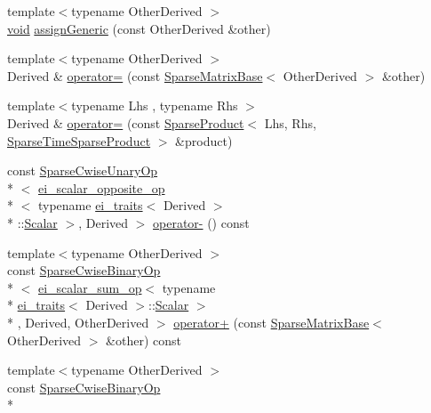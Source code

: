 \begin{DoxyCompactItemize}
\item 
{\footnotesize template$<$typename Other\-Derived $>$ }\\\hyperlink{group___u_a_v_objects_plugin_ga444cf2ff3f0ecbe028adce838d373f5c}{void} \hyperlink{class_sparse_matrix_base_a5dba5509793e59e98ffb80a38af7ca32}{assign\-Generic} (const Other\-Derived \&other)
\item 
{\footnotesize template$<$typename Other\-Derived $>$ }\\Derived \& \hyperlink{class_sparse_matrix_base_a7542aa76d7d90198af76a907f3893fca}{operator=} (const \hyperlink{class_sparse_matrix_base}{Sparse\-Matrix\-Base}$<$ Other\-Derived $>$ \&other)
\item 
{\footnotesize template$<$typename Lhs , typename Rhs $>$ }\\Derived \& \hyperlink{class_sparse_matrix_base_acc36495ed47118b2d2842e0937b503d6}{operator=} (const \hyperlink{class_sparse_product}{Sparse\-Product}$<$ Lhs, Rhs, \hyperlink{_constants_8h_a19539c4a85742928cd91d83569d63c06a93822fde7ec6e0d227b1d2cff44aa54c}{Sparse\-Time\-Sparse\-Product} $>$ \&product)
\item 
const \hyperlink{class_sparse_cwise_unary_op}{Sparse\-Cwise\-Unary\-Op}\\*
$<$ \hyperlink{structei__scalar__opposite__op}{ei\-\_\-scalar\-\_\-opposite\-\_\-op}\\*
$<$ typename \hyperlink{structei__traits}{ei\-\_\-traits}$<$ Derived $>$\\*
\-::\hyperlink{class_sparse_matrix_base_af39d70f2b7e775e9e17b666cd24128c8}{Scalar} $>$, Derived $>$ \hyperlink{class_sparse_matrix_base_a2975f084d38a39df8e09133c6eeab921}{operator-\/} () const 
\item 
{\footnotesize template$<$typename Other\-Derived $>$ }\\const \hyperlink{class_sparse_cwise_binary_op}{Sparse\-Cwise\-Binary\-Op}\\*
$<$ \hyperlink{structei__scalar__sum__op}{ei\-\_\-scalar\-\_\-sum\-\_\-op}$<$ typename \\*
\hyperlink{structei__traits}{ei\-\_\-traits}$<$ Derived $>$\-::\hyperlink{class_sparse_matrix_base_af39d70f2b7e775e9e17b666cd24128c8}{Scalar} $>$\\*
, Derived, Other\-Derived $>$ \hyperlink{class_sparse_matrix_base_a68af87c6dd0353a442d5f4508a00cf8b}{operator+} (const \hyperlink{class_sparse_matrix_base}{Sparse\-Matrix\-Base}$<$ Other\-Derived $>$ \&other) const 
\item 
{\footnotesize template$<$typename Other\-Derived $>$ }\\const \hyperlink{class_sparse_cwise_binary_op}{Sparse\-Cwise\-Binary\-Op}\\*

\end{DoxyCompactItemize}
